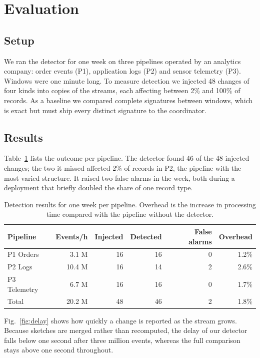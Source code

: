 \section{Evaluation}\label{sec:evaluation}
\subsection{Setup}
We ran the detector for one week on three pipelines operated by an analytics company: order events (P1), application logs (P2) and sensor telemetry (P3). Windows were one minute long. To measure detection we injected 48 changes of four kinds into copies of the streams, each affecting between 2\% and 100\% of records. As a baseline we compared complete signatures between windows, which is exact but must ship every distinct signature to the coordinator.

\subsection{Results}
Table~\ref{tab:results} lists the outcome per pipeline. The detector found 46 of the 48 injected changes; the two it missed affected 2\% of records in P2, the pipeline with the most varied structure. It raised two false alarms in the week, both during a deployment that briefly doubled the share of one record type.

\begin{table}[t]
  \caption{Detection results for one week per pipeline. Overhead is the increase in processing time compared with the pipeline without the detector.}
  \label{tab:results}
  \centering
  \begin{tabular}{lrrrrr}
    \toprule
    Pipeline & Events/h & Injected & Detected & False alarms & Overhead \\
    \midrule
    P1 Orders    &  3.1 M & 16 & 16 & 0 & 1.2\% \\
    P2 Logs      & 10.4 M & 16 & 14 & 2 & 2.6\% \\
    P3 Telemetry &  6.7 M & 16 & 16 & 0 & 1.7\% \\
    \midrule
    Total        & 20.2 M & 48 & 46 & 2 & 1.8\% \\
    \bottomrule
  \end{tabular}
\end{table}

Fig.~\ref{fig:delay} shows how quickly a change is reported as the stream grows. Because sketches are merged rather than recomputed, the delay of our detector falls below one second after three million events, whereas the full comparison stays above one second throughout.

